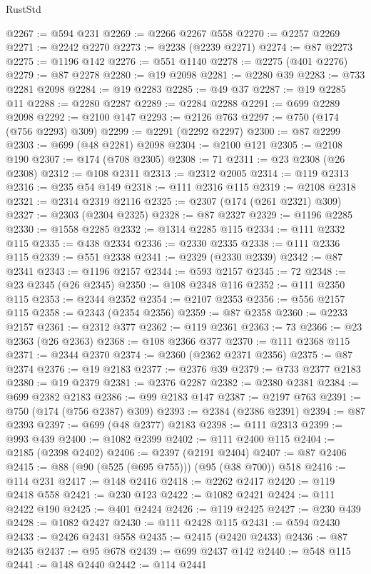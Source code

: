 \begin{lexlean}{RustStd}
\begin{coremodule}
@2267 := @594 @231
@2269 := @2266 @2267 @558
@2270 := @2257 @2269
@2271 := @2242 @2270
@2273 := @2238 (@2239 @2271)
@2274 := @87 @2273
@2275 := @1196 @142
@2276 := @551 @1140
@2278 := @2275 (@401 @2276)
@2279 := @87 @2278
@2280 := @19 @2098
@2281 := @2280 @39
@2283 := @733 @2281 @2098
@2284 := @19 @2283
@2285 := @49 @37
@2287 := @19 @2285 @11
@2288 := @2280 @2287
@2289 := @2284 @2288
@2291 := @699 @2289 @2098
@2292 := @2100 @147
@2293 := @2126 @763
@2297 := @750 (@174 (@756 @2293) @309)
@2299 := @2291 (@2292 @2297)
@2300 := @87 @2299
@2303 := @699 (@48 @2281) @2098
@2304 := @2100 @121
@2305 := @2108 @190
@2307 := @174 (@708 @2305)
@2308 := 71
@2311 := @23 @2308 (@26 @2308)
@2312 := @108 @2311
@2313 := @2312 @2005
@2314 := @119 @2313
@2316 := @235 @54 @149
@2318 := @111 @2316 @115
@2319 := @2108 @2318
@2321 := @2314 @2319 @2116
@2325 := @2307 (@174 (@261 @2321) @309)
@2327 := @2303 (@2304 @2325)
@2328 := @87 @2327
@2329 := @1196 @2285
@2330 := @1558 @2285
@2332 := @1314 @2285 @115
@2334 := @111 @2332 @115
@2335 := @438 @2334
@2336 := @2330 @2335
@2338 := @111 @2336 @115
@2339 := @551 @2338
@2341 := @2329 (@2330 @2339)
@2342 := @87 @2341
@2343 := @1196 @2157
@2344 := @593 @2157
@2345 := 72
@2348 := @23 @2345 (@26 @2345)
@2350 := @108 @2348 @116
@2352 := @111 @2350 @115
@2353 := @2344 @2352
@2354 := @2107 @2353
@2356 := @556 @2157 @115
@2358 := @2343 (@2354 @2356)
@2359 := @87 @2358
@2360 := @2233 @2157
@2361 := @2312 @377
@2362 := @119 @2361
@2363 := 73
@2366 := @23 @2363 (@26 @2363)
@2368 := @108 @2366 @377
@2370 := @111 @2368 @115
@2371 := @2344 @2370
@2374 := @2360 (@2362 @2371 @2356)
@2375 := @87 @2374
@2376 := @19 @2183
@2377 := @2376 @39
@2379 := @733 @2377 @2183
@2380 := @19 @2379
@2381 := @2376 @2287
@2382 := @2380 @2381
@2384 := @699 @2382 @2183
@2386 := @99 @2183 @147
@2387 := @2197 @763
@2391 := @750 (@174 (@756 @2387) @309)
@2393 := @2384 (@2386 @2391)
@2394 := @87 @2393
@2397 := @699 (@48 @2377) @2183
@2398 := @111 @2313
@2399 := @993 @439
@2400 := @1082 @2399
@2402 := @111 @2400 @115
@2404 := @2185 (@2398 @2402)
@2406 := @2397 (@2191 @2404)
@2407 := @87 @2406
@2415 := @88 (@90 (@525 (@695 @755))) (@95 (@38 @700)) @518
@2416 := @114 @231
@2417 := @148 @2416
@2418 := @2262 @2417
@2420 := @119 @2418 @558
@2421 := @230 @123
@2422 := @1082 @2421
@2424 := @111 @2422 @190
@2425 := @401 @2424
@2426 := @119 @2425
@2427 := @230 @439
@2428 := @1082 @2427
@2430 := @111 @2428 @115
@2431 := @594 @2430
@2433 := @2426 @2431 @558
@2435 := @2415 (@2420 @2433)
@2436 := @87 @2435
@2437 := @95 @678
@2439 := @699 @2437 @142
@2440 := @548 @115
@2441 := @148 @2440
@2442 := @114 @2441

\end{coremodule}
\end{lexlean}
